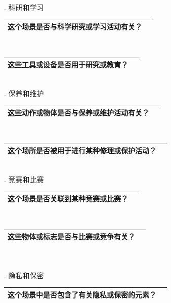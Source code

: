 \documentclass[12pt]{book}
\begin{document}
. 科研和学习

\begin{tabular}{|p{15cm}|p{3cm}|}
	\hline
这个场景是否与科学研究或学习活动有关？\\
	\hline
\end{tabular}\\



\begin{tabular}{|p{15cm}|p{3cm}|}
	\hline
这些工具或设备是否用于研究或教育？\\
	\hline
\end{tabular}\\


. 保养和维护

\begin{tabular}{|p{15cm}|p{3cm}|}
	\hline
这些动作或物体是否与保养或维护活动有关？\\
	\hline
\end{tabular}\\


\begin{tabular}{|p{15cm}|p{3cm}|}
	\hline
这个场所是否被用于进行某种修理或保护活动？\\
	\hline
\end{tabular}\\

. 竞赛和比赛

\begin{tabular}{|p{15cm}|p{3cm}|}
	\hline
这个场景是否关联到某种竞赛或比赛？\\
	\hline
\end{tabular}\\



\begin{tabular}{|p{15cm}|p{3cm}|}
	\hline
这些物体或标志是否与比赛或竞争有关？\\
	\hline
\end{tabular}\\\\



. 隐私和保密

\begin{tabular}{|p{15cm}|p{3cm}|}
	\hline
这个场景中是否包含了有关隐私或保密的元素？\\
	\hline
\end{tabular}\\
\end{document}
